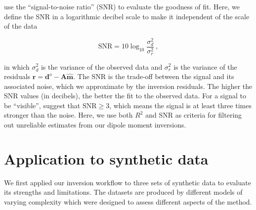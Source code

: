 \citet{CortesOrtuno2021} use the ``signal-to-noise ratio'' (SNR) to evaluate the goodness of fit.
Here, we define the SNR in a logarithmic decibel scale to make it independent of the scale of the data

\begin{equation}
\label{eq_snr}
\text{SNR} = 10 \log_{10}\dfrac{\sigma^2_d}{\sigma^2_r}\ ,
\end{equation}

\noindent
in which $\sigma^2_d$ is the variance of the observed data and $\sigma^2_r$ is the variance of the residuals $\mathbf{r} = \mathbf{d}^o - \mathbf{A}\hat{\mathbf{m}}$.
The SNR is the trade-off between the signal and its associated noise, which we approximate by the inversion residuals.
The higher the SNR values (in decibels), the better the fit to the observed data.
For a signal to be ``visible'', \citet{Strum2014} suggest that $\text{SNR} \ge 3$, which means the signal is at least three times stronger than the noise.
Here, we use both $R^2$ and SNR as criteria for filtering out unreliable estimates from our dipole moment inversions.


\section{Application to synthetic data}

We first applied our inversion workflow to three sets of synthetic data to evaluate its strengths and limitations.
The datasets are produced by different models of varying complexity which were designed to assess different aspects of the method.

